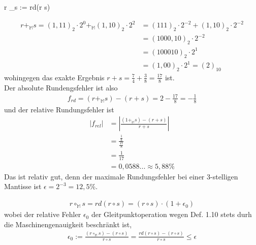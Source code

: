 \documentclass[fontsize=13pt, parskip=half]{scrreprt}
\newcounter{BoxCounter}
\begin{document}
\begin{abox}
	r \circ _{}s := rd\left(r \circ s\right)
\end{abox}

\begin{tbox}
	\begin{align*}
	r + _{\mathbb{M}} s = \left(1,11\right)_2 \cdot 2^0 +_{\mathbb{M}} \left(1,10\right)_2 \cdot 2^2 &= \left(111\right)_2 \cdot 2^{-2} + \left(1,10\right)_2 \cdot 2^{-2}\\
	&= \left(1000,10\right)_2 \cdot 2^{-2}\\
	&= \left(100010\right)_2 \cdot 2^1\\
	&= \left(1,00\right)_2 \cdot 2^1 = \left(2\right)_{10}
	\end{align*}
	wohingegen das exakte Ergebnis $ r+s = \frac74 + \frac38 = \frac{17}{8}$ ist.\\
	Der absolute Rundengsfehler ist also
	\begin{align*}
	f_{rd} = \left(r+_{\mathbb{M}} s\right) - \left(r + s\right) = 2 -\frac{17}{8} = -\frac{1}{8}
	\end{align*}
	und der relative Rundungsfehler ist
	\begin{align*}
	|f_{rel}| &= |\frac{\left(1 +_{\mathbb{M}} s\right)-\left(r+s\right)}{r+s}|\\
	&= \frac{\frac18}{\frac{17}{8}}\\
	&= \frac{1}{17}\\
	&= 0,0588... \approx 5,88\%
\end{align*}
	Das ist relativ gut, denn der maximale Rundungsfehler bei einer 3-stelligen Mantisse ist
	$\epsilon =   2^{-3} = 12,5\%$.
\end{tbox}


\begin{tbox}
	\begin{align*}
	r \circ_{\mathbb{M}} s = rd\left(r \circ s\right) = \left(r\circ s\right)\cdot\left(1 + \epsilon_0\right)
	\end{align*}
	wobei der relative Fehler $\epsilon_0$ der Gleitpunktoperation wegen Def. 1.10 stets durh die Maschinengenauigkeit beschränkt ist,
	\begin{align*}
	\epsilon_0 := \frac{\left(r\circ_{\mathbb{M}} s\right)-\left(r \circ s\right)}{r \circ s} = \frac{rd\left(r \circ s\right) - \left(r \circ s\right)}{r \circ s} \leqslant \epsilon
	\end{align*}
\end{tbox}
\end{document}
